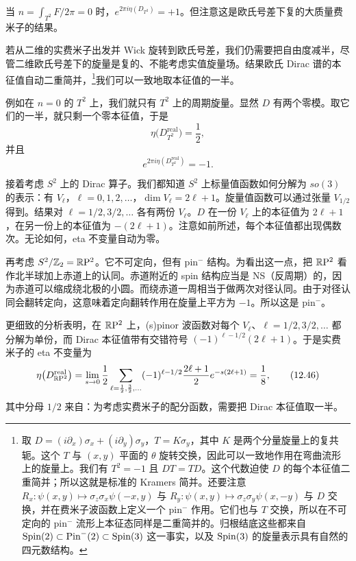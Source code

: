 当 $n=\int_{T^2}F/2\pi=0$ 时，$e^{2\pi i\eta(D_{T^2})}=+1$。但注意这是欧氏号差下复的大质量费米子的结果。

若从二维的实费米子出发并 Wick 旋转到欧氏号差，我们仍需要把自由度减半，尽管二维欧氏号差下的旋量是复的、不能考虑实值旋量场。结果欧氏 Dirac 谱的本征值自动二重简并，\footnote{取 $D=(i\partial_x)\sigma_x+(i\partial_y)\sigma_y$，$T=K\sigma_y$，其中 $K$ 是两个分量旋量上的复共轭。这个 $T$ 与 $(x,y)$ 平面的 $\theta$ 旋转交换，因此可以一致地作用在弯曲流形上的旋量上。我们有 $T^2=-1$ 且 $DT=TD$。这个代数迫使 $D$ 的每个本征值二重简并；所以这就是标准的 Kramers 简并。还要注意 $R_x:\psi(x,y)\mapsto\sigma_z\sigma_x\psi(-x,y)$ 与 $R_y:\psi(x,y)\mapsto\sigma_z\sigma_y\psi(x,-y)$ 与 $D$ 交换，并在费米子波函数上定义一个 pin$^-$ 作用。它们也与 $T$ 交换，所以在不可定向的 pin$^-$ 流形上本征态同样是二重简并的。归根结底这些都来自 $\mathrm{Spin}(2)\subset\mathrm{Pin}^-(2)\subset\mathrm{Spin}(3)$ 这一事实，以及 $\mathrm{Spin}(3)$ 的旋量表示具有自然的四元数结构。}我们可以一致地取本征值的一半。

例如在 $n=0$ 的 $T^2$ 上，我们就只有 $T^2$ 上的周期旋量。显然 $D$ 有两个零模。取它们的一半，就只剩一个零本征值，于是
\begin{equation}
  \eta\bigl(D^{\text{real}}_{T^2}\bigr)=\frac{1}{2},
  \tag{12.44}
\end{equation}
并且
\begin{equation}
  e^{2\pi i\eta(D^{\text{real}}_{T^2})}=-1 .
  \tag{12.45}
\end{equation}

接着考虑 $S^2$ 上的 Dirac 算子。我们都知道 $S^2$ 上标量值函数如何分解为 $so(3)$ 的表示：有 $V_\ell$，$\ell=0,1,2,\dots$，$\dim V_\ell=2\ell+1$。旋量值函数可以通过张量 $V_{1/2}$ 得到。结果对 $\ell=1/2,3/2,\dots$ 各有两份 $V_\ell$。$D$ 在一份 $V_\ell$ 上的本征值为 $2\ell+1$，在另一份上的本征值为 $-(2\ell+1)$。注意如前所述，每个本征值都出现偶数次。无论如何，eta 不变量自动为零。

再考虑 $S^2/\mathbb{Z}_2=\mathbb{R}\mathrm{P}^2$。它不可定向，但有 pin$^-$ 结构。为看出这一点，把 $\mathbb{R}\mathrm{P}^2$ 看作北半球加上赤道上的认同。赤道附近的 spin 结构应当是 NS（反周期）的，因为赤道可以缩成绕北极的小圆。而绕赤道一周相当于做两次对径认同。由于对径认同会翻转定向，这意味着定向翻转作用在旋量上平方为 $-1$。所以这是 pin$^-$。

更细致的分析表明，在 $\mathbb{R}\mathrm{P}^2$ 上，(s)pinor 波函数对每个 $V_\ell$、$\ell=1/2,3/2,\dots$ 都分解为单份，而 Dirac 本征值带有交错符号 $(-1)^{\ell-1/2}(2\ell+1)$。于是实费米子的 eta 不变量为
\begin{equation}
  \eta\bigl(D^{\text{real}}_{\mathbb{R}\mathrm{P}^2}\bigr)
  =\lim_{s\to0}\frac{1}{2}\sum_{\ell=\frac12,\frac32,\dots}
  (-1)^{\ell-1/2}\frac{2\ell+1}{2}e^{-s(2\ell+1)}=\frac{1}{8},
  \tag{12.46}
\end{equation}
其中分母 $1/2$ 来自：为考虑实费米子的配分函数，需要把 Dirac 本征值取一半。

